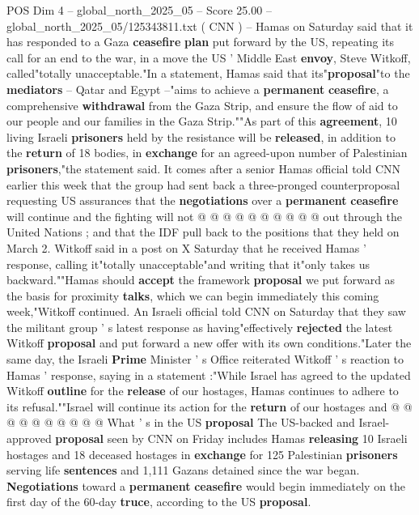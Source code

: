 \begin{textsample}{POS Dim 4 – global\_north\_2025\_05 – Score 25.00 – global\_north\_2025\_05/125343811.txt}  \label{ex:f4_pos_197}
( CNN ) -- Hamas on Saturday said that it has responded to a Gaza \textbf{ceasefire} \textbf{plan} put forward by the US, repeating its call for an end to the war, in a move the US ' Middle East \textbf{envoy}, Steve Witkoff, called"totally unacceptable."In a statement, Hamas said that its"\textbf{proposal}"to the \textbf{mediators} -- Qatar and Egypt --"aims to achieve a \textbf{permanent} \textbf{ceasefire}, a comprehensive \textbf{withdrawal} from the Gaza Strip, and ensure the flow of aid to our people and our families in the Gaza Strip.""As part of this \textbf{agreement}, 10 living Israeli \textbf{prisoners} held by the resistance will be \textbf{released}, in addition to the \textbf{return} of 18 bodies, in \textbf{exchange} for an agreed-upon number of Palestinian \textbf{prisoners},"the statement said.
It comes after a senior Hamas official told CNN earlier this week that the group had sent back a three-pronged counterproposal requesting US assurances that the \textbf{negotiations} over a \textbf{permanent} \textbf{ceasefire} will continue and the fighting will not @ @ @ @ @ @ @ @ @ @ out through the United Nations ; and that the IDF pull back to the positions that they held on March 2.
Witkoff said in a post on X Saturday that he received Hamas ' response, calling it"totally unacceptable"and writing that it"only takes us backward.""Hamas should \textbf{accept} the framework \textbf{proposal} we put forward as the basis for proximity \textbf{talks}, which we can begin immediately this coming week,"Witkoff continued.
An Israeli official told CNN on Saturday that they saw the militant group ' s latest response as having"effectively \textbf{rejected} the latest Witkoff \textbf{proposal} and put forward a new offer with its own conditions."Later the same day, the Israeli \textbf{Prime} Minister ' s Office reiterated Witkoff ' s reaction to Hamas ' response, saying in a statement :"While Israel has agreed to the updated Witkoff \textbf{outline} for the \textbf{release} of our hostages, Hamas continues to adhere to its refusal.""Israel will continue its action for the \textbf{return} of our hostages and @ @ @ @ @ @ @ @ @ @ What ' s in the US \textbf{proposal} The US-backed and Israel-approved \textbf{proposal} seen by CNN on Friday includes Hamas \textbf{releasing} 10 Israeli hostages and 18 deceased hostages in \textbf{exchange} for 125 Palestinian \textbf{prisoners} serving life \textbf{sentences} and 1,111 Gazans detained since the war began. \textbf{Negotiations} toward a \textbf{permanent} \textbf{ceasefire} would begin immediately on the first day of the 60-day \textbf{truce}, according to the US \textbf{proposal}.

\end{textsample}
